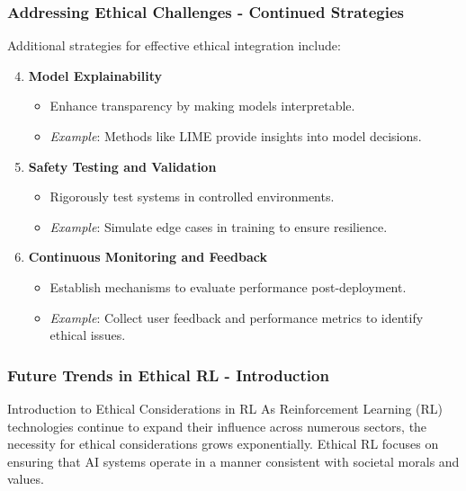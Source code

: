\documentclass{beamer}
\begin{document}
\begin{frame}[fragile]
    \frametitle{Addressing Ethical Challenges - Continued Strategies}
    Additional strategies for effective ethical integration include:
    \begin{enumerate}
        \setcounter{enumi}{3} %
        \item \textbf{Model Explainability}
            \begin{itemize}
                \item Enhance transparency by making models interpretable.
                \item \textit{Example}: Methods like LIME provide insights into model decisions.
            \end{itemize}
        \item \textbf{Safety Testing and Validation}
            \begin{itemize}
                \item Rigorously test systems in controlled environments.
                \item \textit{Example}: Simulate edge cases in training to ensure resilience.
            \end{itemize}
        \item \textbf{Continuous Monitoring and Feedback}
            \begin{itemize}
                \item Establish mechanisms to evaluate performance post-deployment.
                \item \textit{Example}: Collect user feedback and performance metrics to identify ethical issues.
            \end{itemize}
    \end{enumerate}
\end{frame}

\begin{frame}[fragile]
    \frametitle{Future Trends in Ethical RL - Introduction}
    \begin{block}{Introduction to Ethical Considerations in RL}
        As Reinforcement Learning (RL) technologies continue to expand their influence across numerous sectors, the necessity for ethical considerations grows exponentially. 
        Ethical RL focuses on ensuring that AI systems operate in a manner consistent with societal morals and values.
    \end{block}
\end{frame}
\end{document}
